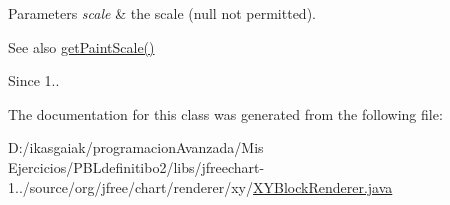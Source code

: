 \begin{DoxyParams}{Parameters}
{\em scale} & the scale ({\ttfamily null} not permitted).\\
\hline
\end{DoxyParams}
\begin{DoxySeeAlso}{See also}
\mbox{\hyperlink{classorg_1_1jfree_1_1chart_1_1renderer_1_1xy_1_1_x_y_block_renderer_ab9b579727809c4213cce490cbeed1d94}{get\+Paint\+Scale()}} 
\end{DoxySeeAlso}
\begin{DoxySince}{Since}
1.. 
\end{DoxySince}


The documentation for this class was generated from the following file\+:\begin{DoxyCompactItemize}
\item 
D\+:/ikasgaiak/programacion\+Avanzada/\+Mis Ejercicios/\+P\+B\+Ldefinitibo2/libs/jfreechart-\/1../source/org/jfree/chart/renderer/xy/\mbox{\hyperlink{_x_y_block_renderer_8java}{X\+Y\+Block\+Renderer.\+java}}\end{DoxyCompactItemize}
